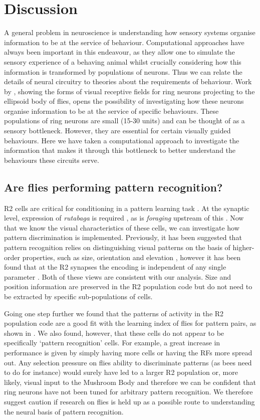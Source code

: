 \section{Discussion}
A general problem in neuroscience is understanding how sensory systems organise information to be at the service of behaviour. Computational approaches have always been important in this endeavour, as they allow one to simulate the sensory experience of a behaving animal whilst crucially considering how this information is transformed by populations of neurons. Thus we can relate the details of neural circuitry to theories about the requirements of behaviour.
Work by , showing the forms of visual receptive fields for ring neurons projecting to the ellipsoid body of flies, opens the possibility of investigating how these neurons organise information to be at the service of specific behaviours. These populations of ring neurons are small (15-30 units) and can be thought of as a sensory bottleneck. However, they are essential for certain visually guided behaviours. Here we have taken a computational approach  to investigate the information that makes it through this bottleneck to better understand the behaviours these circuits serve.

\subsection{Are flies performing pattern recognition?}

R2 cells are critical for conditioning in a pattern learning task \cite{Pan2009}. At the synaptic level, expression of \emph{rutabaga} is required \cite{Pan2009}, as is \emph{foraging} upstream of this \cite{Wang2008}. Now that we know the visual characteristics of these cells, we can investigate how pattern discrimination is implemented. Previously, it has been suggested that pattern recognition relies on distinguishing visual patterns on the basis of higher-order properties, such as size, orientation and elevation \cite{Ernst1999,Pan2009}, however it has been found that at the R2 synapses the encoding is independent of any single parameter \cite{Liu2006}. Both of these views are consistent with our analysis. Size and position information are preserved in the R2 population code but do not need to be extracted by specific sub-populations of cells. 

Going one step further we found that the patterns of activity in the R2 population code are a good fit with the learning index of flies for pattern pairs, as shown in . We also found, however, that these cells do not appear to be specifically `pattern recognition' cells.
For example, a great increase in performance is given by simply having more cells or having the RFs more spread out. Any selection pressure on flies ability to discriminate patterns (as bees need to do for instance) would surely have led to a larger R2 population or, more likely, visual input to the Mushroom Body and therefore we can be confident that ring neurons have not been tuned for arbitrary pattern recognition. We therefore suggest caution if research on flies is held up as a possible route to understanding the neural basis of pattern recognition.

